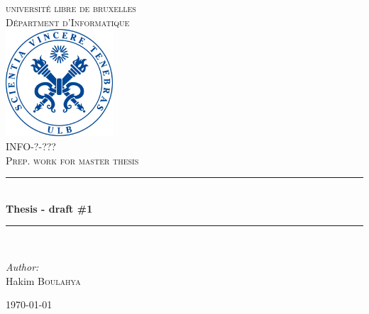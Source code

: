 \documentclass[letterpaper]{article}
\newcommand{\HRule}{\rule{\linewidth}{0.5mm}} %
\begin{document}
\begin{titlepage}
\begin{center}


\textsc{\LARGE universit\'e libre de bruxelles}\\[1.0cm]
\textsc{\Large D\'epartment d'Informatique}\\[1.5cm]

\includegraphics[width=0.3\textwidth]{images/ulblogo.jpg}~\\[1cm]

\textsc{
\large INFO-?-??? \\
\Large  Prep. work for master thesis
 \\[1cm]}
\HRule \\[0.7cm]

{ \huge \bfseries Thesis - draft \#1 \\[0.7cm] }

\HRule \\[2cm]

\noindent
\begin{center} \large

\emph{Author:}\\
\Large Hakim \textsc{Boulahya}\\
\end{center}
\begin{center} \large


\end{center}

\vfill

{\large \today}

\end{center}
\end{titlepage}

\tableofcontents
\newpage
\end{document}
